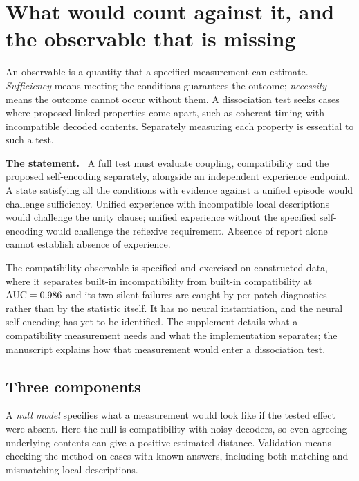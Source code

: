 \documentclass[11pt]{article}
\newcommand{\statement}{\par\smallskip\noindent\textbf{The statement.}\ }
\begin{document}
\section{What would count against it, and the observable that is missing}

An observable is a quantity that a specified measurement can estimate.
\emph{Sufficiency} means meeting the conditions guarantees the outcome;
\emph{necessity} means the outcome cannot occur without them. A dissociation
test seeks cases where proposed linked properties come apart, such as coherent
timing with incompatible decoded contents. Separately measuring each property
is essential to such a test.

\statement
A full test must evaluate coupling, compatibility and the proposed
self-encoding separately, alongside an independent experience endpoint. A
state satisfying all the conditions with evidence against a unified episode
would challenge sufficiency. Unified experience with incompatible local
descriptions would challenge the unity clause; unified experience without the
specified self-encoding would challenge the reflexive requirement. Absence of
report alone cannot establish absence of experience.

The compatibility observable is specified and exercised on constructed data,
where it separates built-in incompatibility from built-in compatibility at
$\mathrm{AUC}=0.986$ and its two silent failures are caught by
per-patch diagnostics rather than by the statistic itself. It has no neural
instantiation, and the neural self-encoding has yet to be identified. The
supplement details what a compatibility measurement needs and what the
implementation separates; the manuscript explains how that measurement would
enter a dissociation test.

\subsection{Three components}

A \emph{null model} specifies what a measurement would look like if the
tested effect were absent. Here the null is compatibility with noisy decoders,
so even agreeing underlying contents can give a positive estimated distance.
Validation means checking the method on cases with known answers, including
both matching and mismatching local descriptions.
\end{document}
